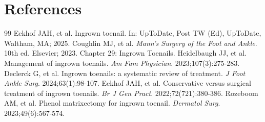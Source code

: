 \section*{References}

\begin{thebibliography}{99}
 Eekhof JAH, et al. Ingrown toenail. In: UpToDate, Post TW (Ed), UpToDate, Waltham, MA; 2025.
 Coughlin MJ, et al. \emph{Mann's Surgery of the Foot and Ankle}. 10th ed. Elsevier; 2023. Chapter 29: Ingrown Toenails.
 Heidelbaugh JJ, et al. Management of ingrown toenails. \emph{Am Fam Physician}. 2023;107(3):275-283.
 Declerck G, et al. Ingrown toenails: a systematic review of treatment. \emph{J Foot Ankle Surg}. 2024;63(1):98-107.
 Eekhof JAH, et al. Conservative versus surgical treatment of ingrown toenails. \emph{Br J Gen Pract}. 2022;72(721):380-386.
 Rozeboom AM, et al. Phenol matrixectomy for ingrown toenail. \emph{Dermatol Surg}. 2023;49(6):567-574.
\end{thebibliography}
